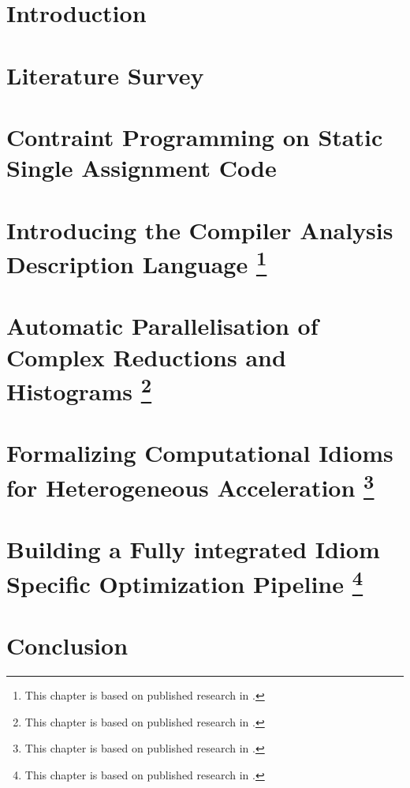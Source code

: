 \documentclass[phd,icsa,twoside,logo,11pt]{infthesis}
\begin{document}
\chapter{Introduction}
    \label{chapter:introduction}
    

\chapter{Literature Survey}
    \label{chapter:literature}
    

\chapter{Contraint Programming on Static Single Assignment Code}
    \label{chapter:theory}
    

\chapter[Introducing the Compiler Analysis Description Language]
        {Introducing the Compiler Analysis Description Language
         \footnote{This chapter is based on published research in
                  \citet{Ginsbach:2018:CDS:3178372.3179515}.}}
    \label{chapter:candl}
    

\chapter[Automatic Parallelisation of Complex Reductions and Histograms]
        {Automatic Parallelisation of Complex Reductions and Histograms
         \footnote{This chapter is based on published research in
                   \citet{ginsbach2017discovery}.}}
    \label{chapter:reductions}
    

\chapter[Formalizing Computational Idioms for Heterogeneous Acceleration]
        {Formalizing Computational Idioms for Heterogeneous Acceleration
         \footnote{This chapter is based on published research in
                   \citet{Ginsbach:2018:AML:3173162.3173182}.}}
    \label{chapter:idioms}
    

\chapter[Building a Fully integrated Idiom Specific Optimization Pipeline]
        {Building a Fully integrated Idiom Specific Optimization Pipeline
         \footnote{This chapter is based on published research in
                   \citet{lilacpaper}.}}
    \label{chapter:lilac}
    

\chapter{Conclusion}



\end{document}
